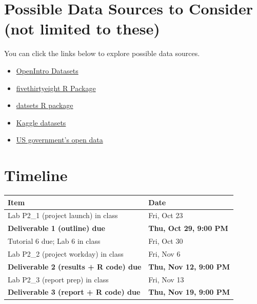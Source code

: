 \documentclass[12pt]{article}
\begin{document}
\section*{Possible Data Sources to Consider (not limited to these)}
You can click the links below to explore possible data sources.
\begin{itemize}
    \item \href{https://www.openintro.org/data/}{OpenIntro Datasets}
    \item \href{https://cran.r-project.org/web/packages/fivethirtyeight/vignettes/fivethirtyeight.html}{fivethirtyeight
    R Package}
    \item \href{https://stat.ethz.ch/R-manual/R-devel/library/datasets/html/00Index.html}{datsets R package}
    \item \href{https://www.kaggle.com/datasets}{Kaggle datasets}
    \item \href{https://data.gov/}{US government's open data}
\end{itemize}


\section*{Timeline}
\begin{center}
\begin{tabular}{ll}
\toprule
\textbf{Item} & \textbf{Date} \\
\midrule
Lab P2\_1 (project launch) in class & Fri, Oct 23 \\
\textbf{Deliverable 1 (outline) due} & \textbf{Thu, Oct 29, 9:00 PM} \\
Tutorial 6 due; Lab 6 in class & Fri, Oct 30 \\
Lab P2\_2 (project workday) in class & Fri, Nov 6 \\
\textbf{Deliverable 2 (results + R code) due} & \textbf{Thu, Nov 12, 9:00 PM} \\
Lab P2\_3 (report prep) in class & Fri, Nov 13 \\
\textbf{Deliverable 3 (report + R code) due} & \textbf{Thu, Nov 19, 9:00 PM} \\
\bottomrule
\end{tabular}
\end{center}
\end{document}
